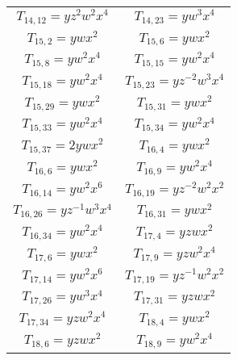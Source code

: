 \begin{longtable}{|c|c|}
$T_{14,12}= yz^2w^2x^4$ &

$T_{14,23}= yw^3x^4$\\

$T_{15,2}= ywx^2$&

$T_{15,6}= ywx^2$\\

$T_{15,8}= yw^2x^4$&

$T_{15,15}= yw^2x^4$\\

$T_{15,18}= yw^2x^4$ &

$T_{15,23}= yz^{-2}w^3x^4$\\

$T_{15,29}= ywx^2$&

$T_{15,31}= ywx^2$\\

$T_{15,33}= yw^2x^4$&

$T_{15,34}= yw^2x^4$\\

$T_{15,37}= 2ywx^2$&

$T_{16,4}= ywx^2$\\

$T_{16,6}= ywx^2$ &

$T_{16,9}= yw^2x^4$\\

$T_{16,14}= yw^2x^6$&

$T_{16,19}= yz^{-2}w^2x^2$\\

$T_{16,26}= yz^{-1}w^3x^4$\quad\quad \quad &

$T_{16,31}= ywx^2$\\

$T_{16,34}= yw^2x^4$&

$T_{17,4}= yzwx^2$\\

$T_{17,6}= ywx^2$&

$T_{17,9}= yzw^2x^4$\\

$T_{17,14}= yw^2x^6$&

$T_{17,19}= yz^{-1}w^2x^2$\\

$T_{17,26}= yw^3x^4$&

$T_{17,31}= yzwx^2$ \\

$T_{17,34}= yzw^2x^4$&

$T_{18,4}= ywx^2$\\

$T_{18,6}= yzwx^2$&

$T_{18,9}= yw^2x^4$\\


\end{longtable}
